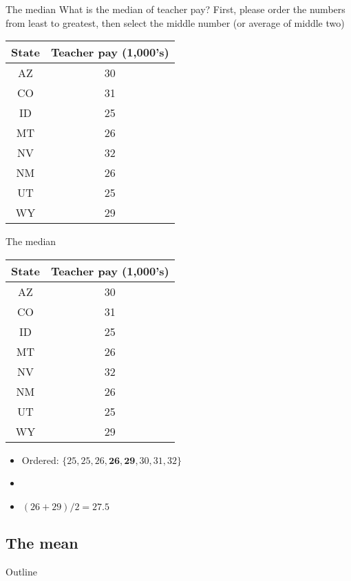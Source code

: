 \documentclass[xcolor=dvipsnames]{beamer}
\begin{document}
\begin{frame}{The median}
	What is the median of teacher pay? First, please order the numbers from least to greatest, then select the middle number (or average of middle two)
	\begin{center}
		\begin{tabular}{|c|c|}
			\hline 
			\textbf{State} & \textbf{Teacher pay (1,000's)} \\ 
			\hline \hline
			AZ & 30 \\ \hline 
			CO &  31 \\ \hline 
			ID & 25  \\  \hline 
			MT &  26 \\ \hline 
			NV & 32 \\ \hline 
			NM &  26 \\ \hline 
			UT &  25 \\ \hline 
			WY &  29 \\ \hline 
		\end{tabular} 
	\end{center}
\end{frame}

\begin{frame}{The median}
		\begin{center}
		\begin{tabular}{|c|c|}
			\hline 
			\textbf{State} & \textbf{Teacher pay (1,000's)} \\ 
			\hline \hline
			AZ & 30 \\ \hline 
			CO &  31 \\ \hline 
			ID & 25  \\  \hline 
			MT &  26 \\ \hline 
			NV & 32 \\ \hline 
			NM &  26 \\ \hline 
			UT &  25 \\ \hline 
			WY &  29 \\ \hline 
		\end{tabular} 
	\end{center}
	\begin{itemize}
		\item Ordered: 	$\{25, 25, 26, \textbf{26}, \textbf{29}, 30, 31, 32\} $
		\item[]
		\item $(26+29)/2 = 27.5$
	\end{itemize}
\end{frame}

\subsection{The mean}
\begin{frame}{Outline}
	\tableofcontents[currentsection,subsectionstyle=show/shaded/hide]
\end{frame}
\end{document}
